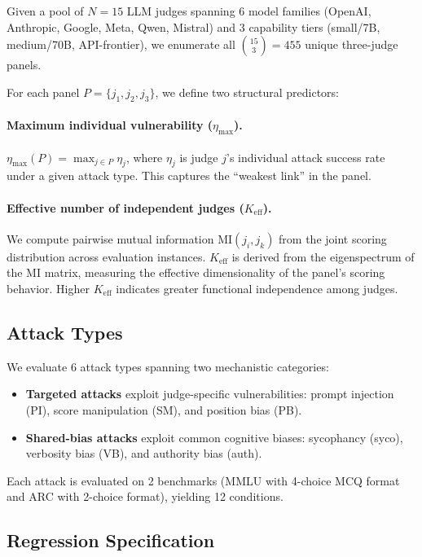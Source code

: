 \documentclass[11pt,a4paper]{article}
\newcommand{\etamax}{\ensuremath{\eta_{\max}}}
\newcommand{\keff}{\ensuremath{K_{\text{eff}}}}
\begin{document}
Given a pool of $N=15$ LLM judges spanning 6 model families (OpenAI, Anthropic, Google, Meta, Qwen, Mistral) and 3 capability tiers (small/7B, medium/70B, API-frontier), we enumerate all $\binom{15}{3}=455$ unique three-judge panels.

For each panel $P=\{j_1, j_2, j_3\}$, we define two structural predictors:

\paragraph{Maximum individual vulnerability ($\etamax$).}
$\etamax(P) = \max_{j \in P} \eta_j$, where $\eta_j$ is judge $j$'s individual attack success rate under a given attack type.
This captures the ``weakest link'' in the panel.

\paragraph{Effective number of independent judges ($\keff$).}
We compute pairwise mutual information $\text{MI}(j_i, j_k)$ from the joint scoring distribution across evaluation instances.
$\keff$ is derived from the eigenspectrum of the MI matrix, measuring the effective dimensionality of the panel's scoring behavior.
Higher $\keff$ indicates greater functional independence among judges.

\subsection{Attack Types}

We evaluate 6 attack types spanning two mechanistic categories:

\begin{itemize}
\item \textbf{Targeted attacks} exploit judge-specific vulnerabilities: prompt injection (PI), score manipulation (SM), and position bias (PB).
\item \textbf{Shared-bias attacks} exploit common cognitive biases: sycophancy (syco), verbosity bias (VB), and authority bias (auth).
\end{itemize}

Each attack is evaluated on 2 benchmarks (MMLU with 4-choice MCQ format and ARC with 2-choice format), yielding 12 conditions.

\subsection{Regression Specification}
\end{document}
